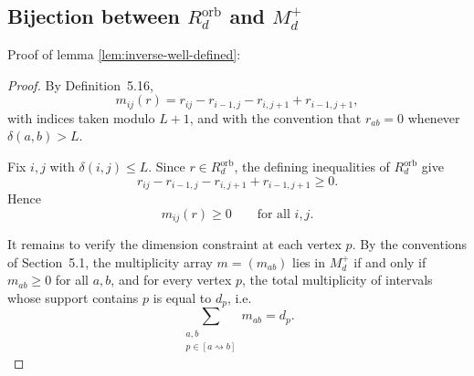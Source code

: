 \documentclass{article}
\theoremstyle{definition}
\begin{document}
\subsection*{Bijection between \(R_d^{\mathrm{orb}}\) and \(M_d^+\)}
Proof of lemma \ref{lem:inverse-well-defined}:
\begin{proof}\label{proof:inverse-well-defined}
By Definition~5.16,
\[
m_{ij}(r)=r_{ij}-r_{i-1,j}-r_{i,j+1}+r_{i-1,j+1},
\]
with indices taken modulo \(L+1\), and with the convention that \(r_{ab}=0\)
whenever \(\delta(a,b)>L\).

Fix \(i,j\) with \(\delta(i,j)\le L\). Since \(r\in R_d^{\mathrm{orb}}\), the defining
inequalities of \(R_d^{\mathrm{orb}}\) give
\[
r_{ij}-r_{i-1,j}-r_{i,j+1}+r_{i-1,j+1}\ge 0.
\]
Hence
\[
m_{ij}(r)\ge 0
\qquad\text{for all } i,j.
\]

It remains to verify the dimension constraint at each vertex \(p\).
By the conventions of Section~5.1, the multiplicity array \(m=(m_{ab})\) lies in
\(M_d^+\) if and only if \(m_{ab}\ge 0\) for all \(a,b\), and for every vertex \(p\),
the total multiplicity of intervals whose support contains \(p\) is equal to \(d_p\), i.e.
\[
\sum_{\substack{a,b\\ p\in [a\rightsquigarrow b]}} m_{ab}=d_p.
\]


\end{proof}
\end{document}
